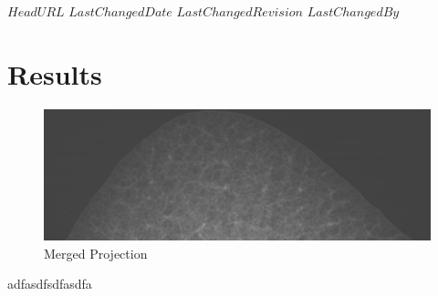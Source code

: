 \svnidlong
{$HeadURL$}
{$LastChangedDate$}
{$LastChangedRevision$}
{$LastChangedBy$}

\section{Results}
\begin{figure}[htbp]
	\centering
		\includegraphics[width=1.00\textwidth]{img/R108C36c_merge0801.png}
	\caption{Merged Projection}
	\label{fig:R108C36c_merge0801}
\end{figure}
adfasdfsdfasdfa
